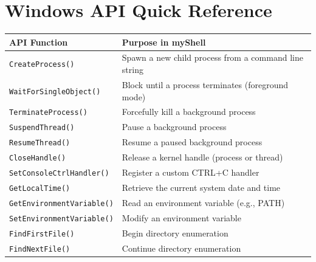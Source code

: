 \documentclass[12pt,a4paper]{article}
\begin{document}
\begin{center}
\end{center}

\newpage
\appendix
\section{Windows API Quick Reference}

\begin{center}
\renewcommand{\arraystretch}{1.4}
\begin{tabularx}{\textwidth}{l X}
    \toprule
    \textbf{API Function} & \textbf{Purpose in myShell} \\
    \midrule
    \texttt{CreateProcess()} & Spawn a new child process from a command line string \\
    \texttt{WaitForSingleObject()} & Block until a process terminates (foreground mode) \\
    \texttt{TerminateProcess()} & Forcefully kill a background process \\
    \texttt{SuspendThread()} & Pause a background process \\
    \texttt{ResumeThread()} & Resume a paused background process \\
    \texttt{CloseHandle()} & Release a kernel handle (process or thread) \\
    \texttt{SetConsoleCtrlHandler()} & Register a custom CTRL+C handler \\
    \texttt{GetLocalTime()} & Retrieve the current system date and time \\
    \texttt{GetEnvironmentVariable()} & Read an environment variable (e.g., PATH) \\
    \texttt{SetEnvironmentVariable()} & Modify an environment variable \\
    \texttt{FindFirstFile()} & Begin directory enumeration \\
    \texttt{FindNextFile()} & Continue directory enumeration \\
    \bottomrule
\end{tabularx}
\end{center}
\end{document}
